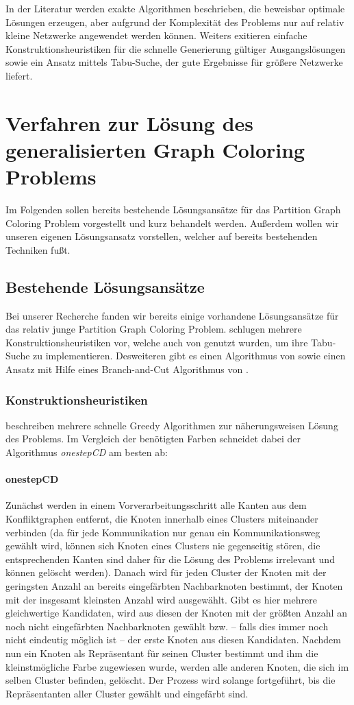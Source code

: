 \documentclass[paper=a4,fontsize=12pt]{scrartcl}
\begin{document}
In der Literatur werden exakte Algorithmen beschrieben, die beweisbar optimale Lösungen erzeugen, aber aufgrund der Komplexität des Problems nur auf relativ kleine Netzwerke angewendet werden können. Weiters exitieren einfache Konstruktionsheuristiken für die schnelle Generierung gültiger Ausgangslösungen sowie ein Ansatz mittels Tabu-Suche, der gute Ergebnisse für größere Netzwerke liefert.

\section{Verfahren zur Lösung des generalisierten Graph Coloring Problems}
Im Folgenden sollen bereits bestehende Lösungsansätze für das Partition Graph Coloring Problem vorgestellt und kurz behandelt werden. Außerdem wollen wir unseren eigenen Lösungsansatz vorstellen, welcher auf bereits bestehenden Techniken fußt.

\subsection{Bestehende Lösungsansätze}
Bei unserer Recherche fanden wir bereits einige vorhandene Lösungsansätze für das relativ junge Partition Graph Coloring Problem. \citet*{Li2000} schlugen mehrere Konstruktionsheuristiken vor, welche auch von \citet*{Noronha2006} genutzt wurden, um ihre Tabu-Suche zu implementieren.
Desweiteren gibt es einen Algorithmus von \citet*{Lu2010} sowie einen Ansatz mit Hilfe eines Branch-and-Cut Algorithmus von \citet*{Palladino2011}.

\subsubsection{Konstruktionsheuristiken}
\label{sec:construct}
\citet*{Li2000} beschreiben mehrere schnelle Greedy Algorithmen zur näherungsweisen Lösung des Problems. Im Vergleich der benötigten Farben schneidet dabei der Algorithmus \emph{onestepCD} am besten ab:
\paragraph{onestepCD}{
Zunächst werden in einem Vorverarbeitungsschritt alle Kanten aus dem Konfliktgraphen entfernt, die Knoten innerhalb eines Clusters miteinander verbinden (da für jede Kommunikation nur genau ein Kommunikationsweg gewählt wird, können sich Knoten eines Clusters nie gegenseitig stören, die entsprechenden Kanten sind daher für die Lösung des Problems irrelevant und können gelöscht werden). Danach wird für jeden Cluster der Knoten mit der geringsten Anzahl an bereits eingefärbten Nachbarknoten bestimmt, der Knoten mit der insgesamt kleinsten Anzahl wird ausgewählt. Gibt es hier mehrere gleichwertige Kandidaten, wird aus diesen der Knoten mit der größten Anzahl an noch nicht eingefärbten Nachbarknoten gewählt bzw. -- falls dies immer noch nicht eindeutig möglich ist -- der erste Knoten aus diesen Kandidaten. Nachdem nun ein Knoten als Repräsentant für seinen Cluster bestimmt und ihm die kleinstmögliche Farbe zugewiesen wurde, werden alle anderen Knoten, die sich im selben Cluster befinden, gelöscht. Der Prozess wird solange fortgeführt, bis die Repräsentanten aller Cluster gewählt und eingefärbt sind.
}
\end{document}
